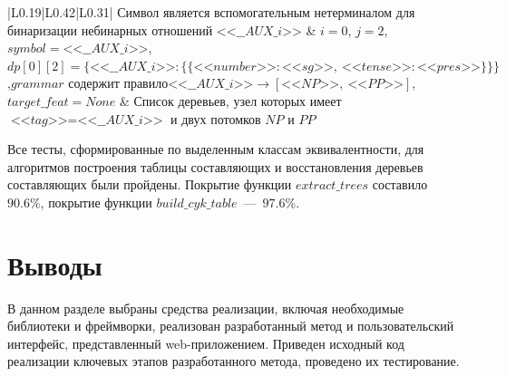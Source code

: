 \begin{longtable}{|L{0.19\linewidth}|L{0.42\linewidth}|L{0.31\linewidth}|}
	Символ является вспомогательным нетерминалом для бинаризации небинарных отношений $\textit{<<\_\_AUX\_i>>}$ & $i=0$, $j=2$, $symbol=\textit{<<\_\_AUX\_i>>}$,\newline$dp[0][2]=\{\textit{<<\_\_AUX\_i>>}: \{\{\textit{<<number>>}:\textit{<<sg>>},\ \textit{<<tense>>}:\textit{<<pres>>}\}\}\}$,\newline$grammar$ содержит правило\newline$\textit{<<\_\_AUX\_i>>} \rightarrow [\textit{<<NP>>},\ \textit{<<PP>>}]$,\newline$target\_feat=None$ & 
	Список деревьев, узел которых имеет $\textit{<<tag>>}=\textit{<<\_\_AUX\_i>>}$ и двух потомков $NP$ и $PP$
	
\end{longtable}
\egroup
\normalsize

Все тесты, сформированные по выделенным классам эквивалентности, для алгоритмов построения таблицы составляющих и восстановления деревьев составляющих были пройдены. Покрытие функции $extract\_trees$ составило $90.6\%$, покрытие функции $build\_cyk\_table$~---~$97.6\%$.

\section*{Выводы}

В данном разделе выбраны средства реализации, включая необходимые библиотеки и фреймворки, реализован разработанный метод и пользовательский интерфейс, представленный web-приложением. Приведен исходный код реализации ключевых этапов разработанного метода, проведено их тестирование.
